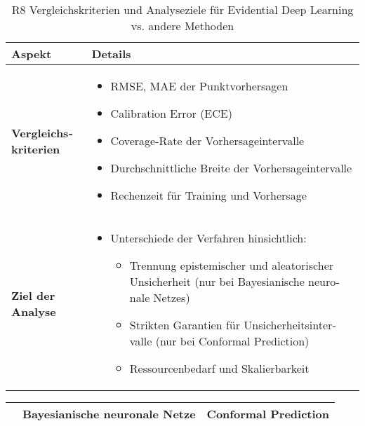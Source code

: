 \begin{otherlanguage}{ngerman}
\begin{table}[htbp]
  \centering
  \footnotesize
  \begin{tabularx}{\textwidth}{|l|X|}
  \hline
  \textbf{Aspekt} & \textbf{Details} \\ \hline

  \textbf{Vergleichskriterien} &
  \begin{itemize}
    \item RMSE, MAE der Punktvorhersagen
    \item Calibration Error (ECE)
    \item Coverage-Rate der Vorhersageintervalle
    \item Durchschnittliche Breite der Vorhersageintervalle
    \item Rechenzeit für Training und Vorhersage
  \end{itemize}
  \\ \hline

  \textbf{Ziel der Analyse} &
  \begin{itemize}
    \item Unterschiede der Verfahren hinsichtlich:
      \begin{itemize}
        \item Trennung epistemischer und aleatorischer Unsicherheit (nur bei \gls{Bayesianische neuronale Netze}s)
        \item Strikten Garantien für Unsicherheitsintervalle (nur bei \gls{Conformal Prediction})
        \item Ressourcenbedarf und Skalierbarkeit
      \end{itemize}
  \end{itemize}
  \\ \hline

  \end{tabularx}
  \caption{R8 Vergleichskriterien und Analyseziele für Evidential Deep Learning vs. andere Methoden}
  \label{tab:vergleichskriterien}
\end{table}




\begin{table}[!htpb]
  \centering
  \footnotesize
  \begin{tabularx}{\textwidth}{|l|X|X|}
    \hline
      & \textbf{\gls{Bayesianische neuronale Netze}} & \textbf{\gls{Conformal Prediction}} \\
    \hline


\end{tabularx}
\end{table}
\end{otherlanguage}
